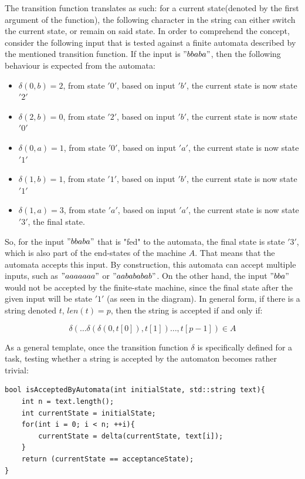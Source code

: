 \documentclass[letterpaper]{article}
\begin{document}
The transition function translates as such: for a current state(denoted by the first argument of the function), the following character in the string can either switch the current state, or remain on said state. In order to comprehend the concept, consider the following input that is tested against a finite automata described by the mentioned transition function. If the input is $"bbaba"$, then the following behaviour is expected from the automata:

\begin{itemize}
    \item $\delta (0, b) = 2$, from state $'0'$, based on input $'b'$, the current state is now state $'2'$
    \item $\delta (2, b) = 0$, from state $'2'$, based on input $'b'$, the current state is now state $'0'$
    \item $\delta (0, a) = 1$, from state $'0'$, based on input $'a'$, the current state is now state $'1'$
    \item $\delta (1, b) = 1$, from state $'1'$, based on input $'b'$, the current state is now state $'1'$
    \item $\delta (1, a) = 3$, from state $'a'$, based on input $'a'$, the current state is now state $'3'$, the final state.
\end{itemize}

So, for the input $"bbaba"$ that is "fed" to the automata, the final state is state $'3'$, which is also part of the end-states of the machine $A$. That means that the automata accepts this input. By construction, this automata can accept multiple inputs, such as $"aaaaaaa"$ or $"aabababab"$. On the other hand, the input $"bba"$ would not be accepted by the finite-state machine, since the final state after the given input will be state $'1'$ (as seen in the diagram). In general form, if there is a string denoted $t$, $len(t) = p$, then the string is accepted if and only if:

$$
\delta ( \dots \delta ( \delta (0, t[0]), t[1] ) \dots, t[p - 1]) \in A
$$


As a general template, once the transition function $\delta$ is specifically defined for a task, testing whether a string is accepted by the automaton becomes rather trivial:

\begin{lstlisting}
bool isAcceptedByAutomata(int initialState, std::string text){
    int n = text.length();
    int currentState = initialState;
    for(int i = 0; i < n; ++i){
        currentState = delta(currentState, text[i]);
    }
    return (currentState == acceptanceState);
}
\end{lstlisting}
\end{document}
